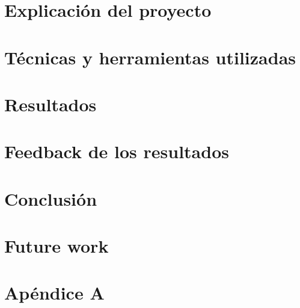 \documentclass[12pt,twoside]{report}
\begin{document}
\chapter{Explicación del proyecto}


\chapter{Técnicas y herramientas utilizadas}


\chapter{Resultados}


\chapter{Feedback de los resultados}


\chapter{Conclusión}


\chapter{Future work}


\appendix
\chapter{Apéndice A}

\end{document}
